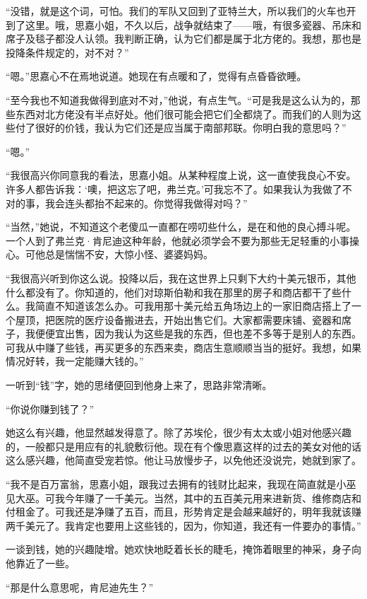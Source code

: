 \par “没错，就是这个词，可怕。我们的军队又回到了亚特兰大，所以我们的火车也开到了这里。哦，思嘉小姐，不久以后，战争就结束了——哦，有很多瓷器、吊床和席子及毯子都没人认领。我判断正确，认为它们都是属于北方佬的。我想，那也是投降条件规定的，对不对？”
\par “嗯。”思嘉心不在焉地说道。她现在有点暖和了，觉得有点昏昏欲睡。
\par “至今我也不知道我做得到底对不对，”他说，有点生气。“可是我是这么认为的，那些东西对北方佬没有半点好处。他们很可能会把它们全都烧了。而我们的人则为这些付了很好的价钱，我认为它们还是应当属于南部邦联。你明白我的意思吗？”
\par “嗯。”
\par “我很高兴你同意我的看法，思嘉小姐。从某种程度上说，这一直使我良心不安。许多人都告诉我：‘噢，把这忘了吧，弗兰克。’可我忘不了。如果我认为我做了不对的事，我会连头都抬不起来的。你觉得我做得对吗？”
\par “当然，”她说，不知道这个老傻瓜一直都在唠叨些什么，是在和他的良心搏斗呢。一个人到了弗兰克·肯尼迪这种年龄，他就必须学会不要为那些无足轻重的小事操心。可他总是惴惴不安，大惊小怪、婆婆妈妈。
\par “我很高兴听到你这么说。投降以后，我在这世界上只剩下大约十美元银币，其他什么都没有了。你知道的，他们对琼斯伯勒和我在那里的房子和商店都干了些什么。我简直不知道该怎么办。可我用那十美元给五角场边上的一家旧商店搭上了一个屋顶，把医院的医疗设备搬进去，开始出售它们。大家都需要床铺、瓷器和席子，我便便宜出售，因为我认为这些是我的东西，但也差不多等于是别人的东西。可我从中赚了些钱，再买更多的东西来卖，商店生意顺顺当当的挺好。我想，如果情况好转，我一定能赚大钱的。”
\par 一听到“钱”字，她的思绪便回到他身上来了，思路非常清晰。
\par “你说你赚到钱了？”
\par 她这么有兴趣，他显然越发得意了。除了苏埃伦，很少有太太或小姐对他感兴趣的，一般都只是用应有的礼貌敷衍他。现在有个像思嘉这样的过去的美女对他的话这么感兴趣，他简直受宠若惊。他让马放慢步子，以免他还没说完，她就到家了。
\par “我不是百万富翁，思嘉小姐，跟我过去拥有的钱财比起来，我现在简直就是小巫见大巫。可我今年赚了一千美元。当然，其中的五百美元用来进新货、维修商店和付租金了。可我还是净赚了五百，而且，形势肯定是会越来越好的，明年我就该赚两千美元了。我肯定也要用上这些钱的，因为，你知道，我还有一件要办的事情。”
\par 一谈到钱，她的兴趣陡增。她欢快地眨着长长的睫毛，掩饰着眼里的神采，身子向他靠近了一些。
\par “那是什么意思呢，肯尼迪先生？”
